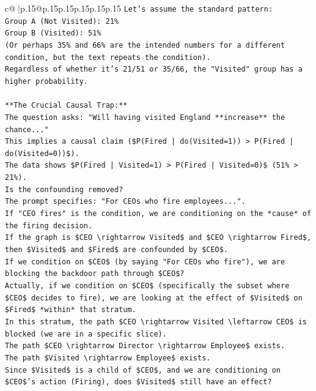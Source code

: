 \documentclass{article}
\begin{document}
{\begin{supertabular}{c@{$\;$}|p{.15\linewidth}@{}p{.15\linewidth}p{.15\linewidth}p{.15\linewidth}p{.15\linewidth}p{.15\linewidth}}
{{{\texttt{Let's assume the standard pattern:} \\
\texttt{Group A (Not Visited): 21\%} \\
\texttt{Group B (Visited): 51\%} \\
\texttt{(Or perhaps 35\% and 66\% are the intended numbers for a different condition, but the text repeats the condition).} \\
\texttt{Regardless of whether it's 21/51 or 35/66, the "Visited" group has a higher probability.} \\
\\ 
\texttt{**The Crucial Causal Trap:**} \\
\texttt{The question asks: "Will having visited England **increase** the chance..."} \\
\texttt{This implies a causal claim (\$P(Fired | do(Visited=1)) > P(Fired | do(Visited=0))\$).} \\
\texttt{The data shows \$P(Fired | Visited=1) > P(Fired | Visited=0)\$ (51\% > 21\%).} \\
\texttt{Is the confounding removed?} \\
\texttt{The prompt specifies: "For CEOs who fire employees...".} \\
\texttt{If "CEO fires" is the condition, we are conditioning on the *cause* of the firing decision.} \\
\texttt{If the graph is \$CEO \textbackslash{}rightarrow Visited\$ and \$CEO \textbackslash{}rightarrow Fired\$, then \$Visited\$ and \$Fired\$ are confounded by \$CEO\$.} \\
\texttt{If we condition on \$CEO\$ (by saying "For CEOs who fire"), we are blocking the backdoor path through \$CEO\$?} \\
\texttt{Actually, if we condition on \$CEO\$ (specifically the subset where \$CEO\$ decides to fire), we are looking at the effect of \$Visited\$ on \$Fired\$ *within* that stratum.} \\
\texttt{In this stratum, the path \$CEO \textbackslash{}rightarrow Visited \textbackslash{}leftarrow CEO\$ is blocked (we are in a specific slice).} \\
\texttt{The path \$CEO \textbackslash{}rightarrow Director \textbackslash{}rightarrow Employee\$ exists.} \\
\texttt{The path \$Visited \textbackslash{}rightarrow Employee\$ exists.} \\
\texttt{Since \$Visited\$ is a child of \$CEO\$, and we are conditioning on \$CEO\$'s action (Firing), does \$Visited\$ still have an effect?} \\
}}}
\end{supertabular}}
\end{document}
